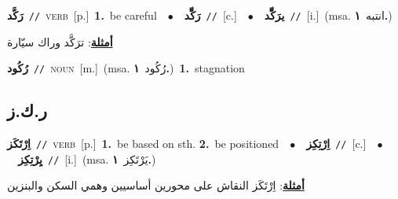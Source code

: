 \documentclass[10pt,a4paper,twoside]{article} %
\begin{document}
\begin{multicols}{2}
{\setlength\topsep{0pt}\textbf{\foreignlanguage{arabic}{رَكَّد}}\ {\color{gray}\texttt{//}\color{black}}\ \textsc{verb}\ [p.]\ \textbf{1.}~be careful\ \ $\bullet$\ \ \setlength\topsep{0pt}\textbf{\foreignlanguage{arabic}{رَكِّّد}}\ {\color{gray}\texttt{//}\color{black}}\ [c.]\ \ $\bullet$\ \ \setlength\topsep{0pt}\textbf{\foreignlanguage{arabic}{يرَكِّّد}}\ {\color{gray}\texttt{//}\color{black}}\ [i.]\ \color{gray}(msa. \foreignlanguage{arabic}{انتبه}~\foreignlanguage{arabic}{\textbf{١.}})\color{black}\  \begin{flushright}\color{gray}\foreignlanguage{arabic}{\textbf{\underline{\foreignlanguage{arabic}{أمثلة}}}: ترَكَّد وراك سيّارة}\end{flushright}\color{black}} \vspace{2mm}

{\setlength\topsep{0pt}\textbf{\foreignlanguage{arabic}{رُكُود}}\ {\color{gray}\texttt{//}\color{black}}\ \textsc{noun}\ [m.]\ \color{gray}(msa. \foreignlanguage{arabic}{رُكُود}~\foreignlanguage{arabic}{\textbf{١.}})\color{black}\ \textbf{1.}~stagnation\ } \vspace{2mm}

\vspace{-3mm}
\subsection*{\color{blue}\foreignlanguage{arabic}{ر.ك.ز}\color{blue}{}} 

{\setlength\topsep{0pt}\textbf{\foreignlanguage{arabic}{اِرْتَكَز}}\ {\color{gray}\texttt{//}\color{black}}\ \textsc{verb}\ [p.]\ \textbf{1.}~be based on sth.  \textbf{2.}~be positioned\ \ $\bullet$\ \ \setlength\topsep{0pt}\textbf{\foreignlanguage{arabic}{اِرْتِكِز}}\ {\color{gray}\texttt{//}\color{black}}\ [c.]\ \ $\bullet$\ \ \setlength\topsep{0pt}\textbf{\foreignlanguage{arabic}{يِرْتِكِز}}\ {\color{gray}\texttt{//}\color{black}}\ [i.]\ \color{gray}(msa. \foreignlanguage{arabic}{يَرْتَكِز}~\foreignlanguage{arabic}{\textbf{١.}})\color{black}\  \begin{flushright}\color{gray}\foreignlanguage{arabic}{\textbf{\underline{\foreignlanguage{arabic}{أمثلة}}}: اِرْتَكَز النقاش على محورين أساسيين وهمي السكن والبنزين}\end{flushright}\color{black}} \vspace{2mm}


\end{multicols}
\end{document}
